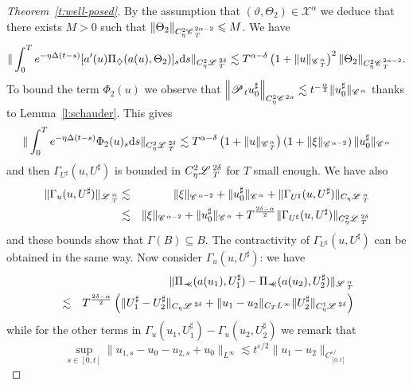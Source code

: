 \documentclass{amsart}
\newcommand{\mathd}{\mathrm{d}}
\newcommand{\nocomma}{}
\newcommand{\precprec}{\prec\!\!\!\prec}
\theoremstyle{remark}
\theoremstyle{definition}
\newcommand{\CC}{\mathscr{C} \hspace{.1em}}
\newcommand{\LL}{\mathscr{L} \hspace{.2em}}
\newcommand{\PP}{\mathscr{P} \hspace{.1em}}
\begin{document}
\begin{proof}[Theorem~\ref{t:well-posed}]
  By the assumption that $(\vartheta, \Theta_2) \in \mathcal{X}^{\alpha}$ we
  deduce that there exists $M > 0$ such that $\| \Theta_2 \|_{C_{\eta}^2
  \CC_T^{2 \alpha - 2}} \leqslant M$. We have
  \[ \| \int_0^T e^{- \eta \Delta (t - s)} [a' (u) \Pi_{\nocomma \diamondsuit}
     (a (u), \Theta_2)]_s \mathd s\|_{C^2_{\eta} \LL_T^{2 \delta}} \lesssim
     T^{\alpha - \delta} \left( 1 + \| u \|_{\CC^{\alpha}_T} \right)^2 \|
     \Theta_2 \|_{C_{\eta}^2 \CC_T^{2 \alpha - 2}} . \]
  To bound the term $\Phi_2 (u)$ we observe that $\left\| \PP_t u^{\sharp}_0
  \right\|_{C_{\eta}^2 \CC^{2 \alpha}} \lesssim t^{- \frac{\alpha}{2}} \|
  u^{\sharp}_0 \|_{\CC^{\alpha}}$ thanks to Lemma~\ref{l:schauder}. This gives
  \[ \| \int_0^T e^{- \eta \Delta (t - s)} \Phi_2 (u)_s \mathd s\|_{C^2_{\eta}
     \LL_T^{2 \delta}} \lesssim T^{\alpha - \delta} \left( 1 + \| u
     \|_{\CC^{\alpha}_T} \right) \left( 1 + \| \xi \|_{\CC^{\alpha - 2}}
     \right) \| u^{\sharp}_0 \|_{\CC^{\alpha}} \]
  and then $\Gamma_{U^{\sharp}} (u, U^{\sharp})$ is bounded in $C^2_{\eta}
  \LL_T^{2 \delta}$ for $T$ small enough. We have also
  \begin{eqnarray*}
    \| \Gamma_u (u, U^{\sharp}) \|_{\LL^{\alpha}_T} & \lesssim & \| \xi
    \|_{\CC^{\alpha - 2}} + \| u^{\sharp}_0 \|_{\CC^{\alpha}} + \|
    \Gamma_{U^{\sharp}} (u, U^{\sharp}) \|_{C_{\eta} \LL_T^{\alpha}}\\
    & \lesssim & \| \xi \|_{\CC^{\alpha - 2}} + \| u^{\sharp}_0
    \|_{\CC^{\alpha}} + T^{\frac{2 \delta - \alpha}{2}} \| \Gamma_{U^{\sharp}}
    (u, U^{\sharp}) \|_{C^2_{\eta} \LL_T^{2 \delta}}
  \end{eqnarray*}
  and these bounds show that $\Gamma (B) \subseteq B$. The contractivity of
  $\Gamma_{U^{\sharp}} (u, U^{\sharp})$ can be obtained in the same way. Now
  consider $\Gamma_u (u, U^{\sharp})$: we have
  \begin{eqnarray*}
    &  & \| \Pi_{\precprec} (a (u_1), U_1^{\sharp}) - \Pi_{\precprec} (a
    (u_2), U_2^{\sharp}) \|_{\LL^{\alpha}_T}\\
    & \lesssim & T^{\frac{2 \delta - \alpha}{2}} \left( \| U^{\sharp}_1 -
    U^{\sharp}_2 \|_{C_{\eta} \LL^{2 \delta}} + \| u_1 - u_2 \|_{C_T
    L^{\infty}} \| U^{\sharp}_2 \|_{C_{\eta}^1 \LL^{2 \delta}} \right)
  \end{eqnarray*}
  while for the other terms in $\Gamma_u (u_1, U^{\sharp}_1) - \Gamma_u (u_2,
  U^{\sharp}_2)$ we remark that
  \[ \sup_{s \in [0, t]} \| u_{1, s} - u_0 - u_{2, s} + u_0 \|_{L^{\infty}}
     \lesssim t^{\varepsilon / 2} \| u_1 - u_2 \|_{C_{[0, t]}^{\varepsilon /
}}\]
\end{proof}
\end{document}
